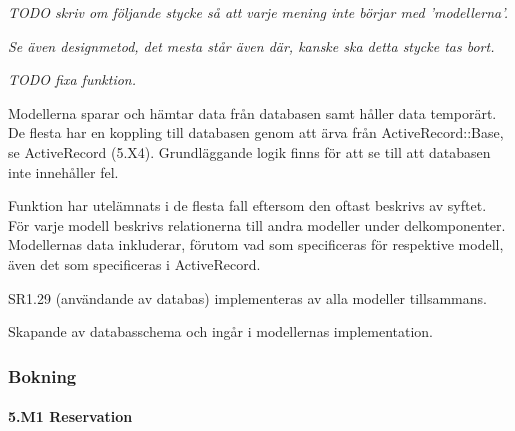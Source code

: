 \documentclass[a4paper, twoside, 11pt, titlepage]{article}
\begin{document}
	\emph{TODO skriv om följande stycke så att varje mening inte börjar med 'modellerna'.}

	\emph{Se även designmetod, det mesta står även där, kanske ska detta stycke tas bort.}

	\emph{TODO fixa funktion.}

	Modellerna sparar och hämtar data från databasen samt håller data temporärt. De flesta har en koppling till databasen genom att ärva från ActiveRecord::Base, se ActiveRecord (5.X4). Grundläggande logik finns för att se till att databasen inte innehåller fel.

	Funktion har utelämnats i de flesta fall eftersom den oftast beskrivs av syftet. För varje modell beskrivs relationerna till andra modeller under delkomponenter. Modellernas data inkluderar, förutom vad som specificeras för respektive modell, även det som specificeras i ActiveRecord.

	SR1.29 (användande av databas) implementeras av alla modeller tillsammans.

	Skapande av databasschema och ingår i modellernas implementation.


		\subsubsection{Bokning}



			\paragraph{5.M1 Reservation}\
\end{document}
